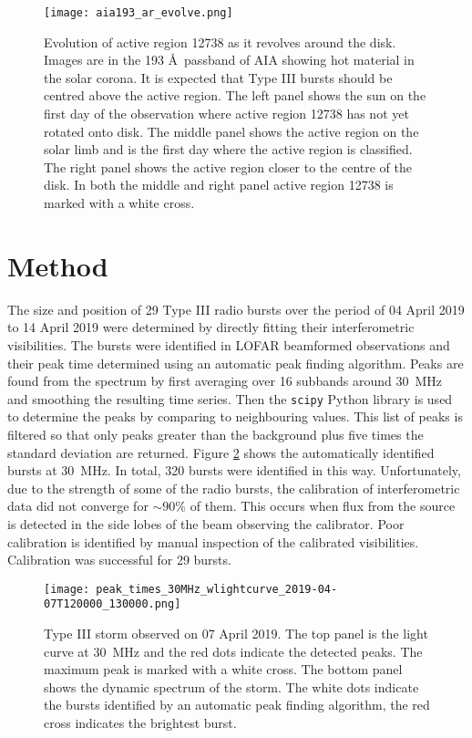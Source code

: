 \begin{figure}[ht]
\centering
\texttt{[image: aia193\_ar\_evolve.png]}
\caption[Evolution of active region 12738 as it revolves around the disk.]{Evolution of active region 12738 as it revolves around the disk. Images are in the 193 \AA \ passband of AIA showing hot material in the solar corona. It is expected that Type III bursts should be centred above the active region. The left panel shows the sun on the first day of the observation where active region 12738 has not yet rotated onto disk. The middle panel shows the active region on the solar limb and is the first day where the active region is classified. The right panel shows the active region closer to the centre of the disk. In both the middle and right panel active region 12738 is marked with a white cross.}
\label{fig:ar_evolve}
\end{figure}

\section{Method}
\label{sec:obsvtheory_method}
The size and position of 29 Type III radio bursts over the period of 04 April 2019 to 14 April 2019 were determined by directly fitting their interferometric visibilities. The bursts were identified in LOFAR beamformed observations and their peak time determined using an automatic peak finding algorithm. Peaks are found from the spectrum by first averaging over 16 subbands around 30~MHz and smoothing the resulting time series. Then the \texttt{scipy} Python library \citep{Virtanen2020} is used to determine the peaks by comparing to neighbouring values. This list of peaks is filtered so that only peaks greater than the background plus five times the standard deviation are returned.
Figure \ref{fig:dynamic_spectrum_070419} shows the automatically identified bursts at 30~MHz. In total, 320 bursts were identified in this way. Unfortunately, due to the strength of some of the radio bursts, the calibration of interferometric data did not converge for $\sim 90 \%$ of them. This occurs when flux from the source is detected in the side lobes of the beam observing the calibrator. Poor calibration is identified by manual inspection of the calibrated visibilities. Calibration was successful for 29 bursts.  

\begin{figure}[ht]
\centering
\texttt{[image: peak\_times\_30MHz\_wlightcurve\_2019-04-07T120000\_130000.png]}
\caption[Type III storm observed on 07 April 2019.]{Type III storm observed on 07 April 2019. The top panel is the light curve at 30~MHz and the red dots indicate the detected peaks. The maximum peak is marked with a white cross. The bottom panel shows the dynamic spectrum of the storm. The white dots indicate the bursts identified by an automatic peak finding algorithm, the red cross indicates the brightest burst.}
\label{fig:dynamic_spectrum_070419}
\end{figure}


